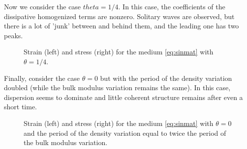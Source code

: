 Now we consider the case $theta=1/4$.  In this case, the coefficients
of the dissipative homogenized terms are nonzero.  Solitary waves are
observed, but there is a lot of 'junk' between and behind them, and the leading
one has two peaks.

\begin{figure}
\begin{center}
\caption{Strain (left) and stress (right) for the medium \eqref{eq:sinmat} with $\theta=1/4$. \label{fig:hop}}
\end{center}
\end{figure}

Finally, consider the case $\theta=0$ but with the period of the density
variation doubled (while the bulk modulus variation remains the same).
In this case, dispersion seems to dominate and little coherent structure
remains after even a short time.

\begin{figure}
\begin{center}
\caption{Strain (left) and stress (right) for the medium \eqref{eq:sinmat} with $\theta=0$ and the period of the density variation equal to twice the period of the bulk modulus variation. \label{fig:dp}}
\end{center}
\end{figure}


\clearpage

